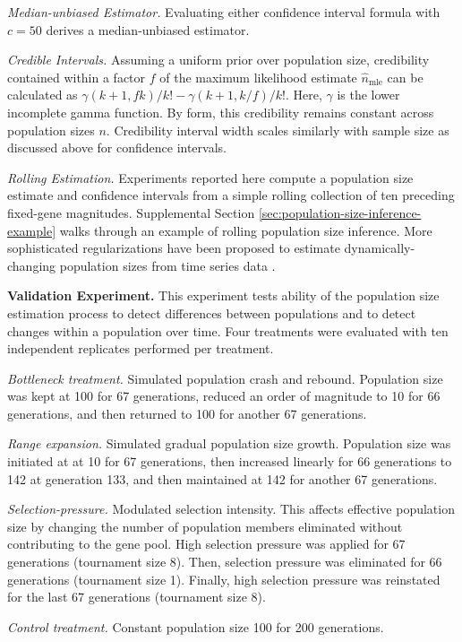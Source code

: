 \textit{Median-unbiased Estimator.}
Evaluating either confidence interval formula with $c = 50$ derives a median-unbiased estimator.

\textit{Credible Intervals.}
Assuming a uniform prior over population size, credibility contained within a factor $f$ of the maximum likelihood estimate $\hat{n}_\mathrm{mle}$ can be calculated as $\gamma(k + 1, f k)/k! - \gamma(k + 1, k/f)/k!$.
Here, $\gamma$ is the lower incomplete gamma function.
By form, this credibility remains constant across population sizes $n$.
Credibility interval width scales similarly with sample size as discussed above for confidence intervals.

\textit{Rolling Estimation.}
Experiments reported here compute a population size estimate and confidence intervals from a simple rolling collection of ten preceding fixed-gene magnitudes.
Supplemental Section \ref{sec:population-size-inference-example} walks through an example of rolling population size inference.
More sophisticated regularizations have been proposed to estimate dynamically-changing population sizes from time series data \citep{hakan2012distributed}.

\textbf{Validation Experiment.}
This experiment tests ability of the population size estimation process to detect differences between populations and to detect changes within a population over time.
Four treatments were evaluated with ten independent replicates performed per treatment.

\textit{Bottleneck treatment.}
Simulated population crash and rebound.
Population size was kept at 100 for 67 generations, reduced an order of magnitude to 10 for 66 generations, and then returned to 100 for another 67 generations.

\textit{Range expansion.}
Simulated gradual population size growth.
Population size was initiated at at 10 for 67 generations, then increased linearly for 66 generations to 142 at generation 133, and then maintained at 142 for another 67 generations.

\textit{Selection-pressure.}
Modulated selection intensity.
This affects effective population size by changing the number of population members eliminated without contributing to the gene pool.
High selection pressure was applied for 67 generations (tournament size 8). Then, selection pressure was eliminated for 66 generations (tournament size 1).
Finally, high selection pressure was reinstated for the last 67 generations (tournament size 8).

\textit{Control treatment.} Constant population size 100 for 200 generations.
